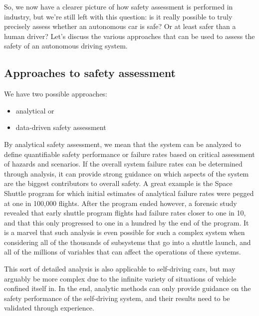So, we now have a clearer picture of how safety assessment is performed in industry, but we're still left with this question: is it really possible to truly precisely 
assess whether an autonomous car is safe? Or at least safer than a human driver? 
Let's discuss the various approaches that can be used to assess the safety of an autonomous driving system. 

\subsection{Approaches to safety assessment}

We have two possible approaches: 

\begin{itemize}
\item analytical or 
\item data-driven safety assessment
\end{itemize}

By analytical safety assessment, we mean that the system can be analyzed to define quantifiable safety performance 
or failure rates based on critical assessment of hazards and scenarios. If the overall system failure rates can be 
determined through analysis, it can provide strong guidance on which 
aspects of the system are the biggest contributors to overall safety. 
A great example is the Space Shuttle program for which initial estimates of analytical failure rates 
were pegged at one in 100,000 flights. After the program ended however, a forensic study 
revealed that early shuttle program flights had failure rates closer to one in 10, and that this only progressed 
to one in a hundred by the end of the program. It is a marvel that such analysis is even possible for such a complex system when considering all
of the thousands of subsystems that go into a shuttle launch, and all of the millions of variables that can affect the operations of these systems. 

This sort of detailed analysis is also applicable to self-driving cars, but may arguably be more complex due to 
the infinite variety of situations of vehicle confined itself in. In the end, analytic methods can only provide guidance on the safety performance 
of the self-driving system, and their results need to be validated through experience. 

